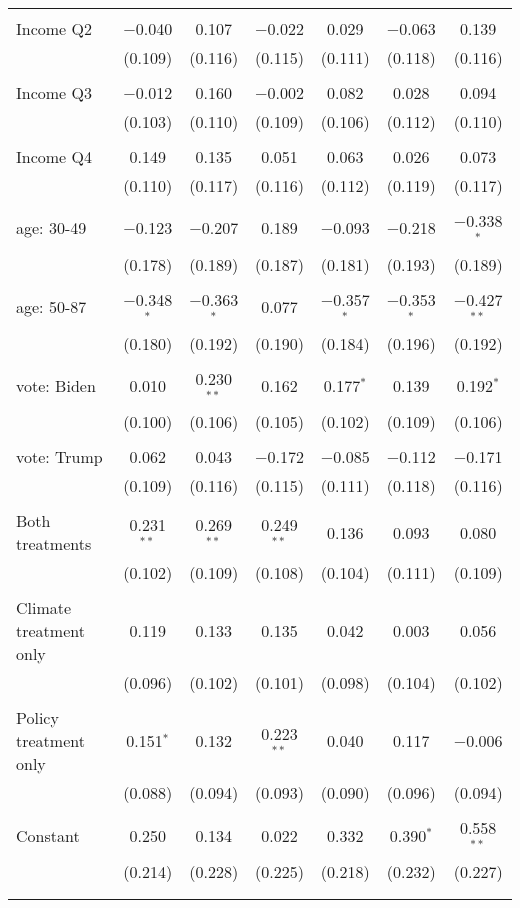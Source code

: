 \begin{tabular}{@{\extracolsep{5pt}}lcccccc}
  & & & & & & \\ 
 Income Q2 & $-$0.040 & 0.107 & $-$0.022 & 0.029 & $-$0.063 & 0.139 \\ 
  & (0.109) & (0.116) & (0.115) & (0.111) & (0.118) & (0.116) \\ 
  & & & & & & \\ 
 Income Q3 & $-$0.012 & 0.160 & $-$0.002 & 0.082 & 0.028 & 0.094 \\ 
  & (0.103) & (0.110) & (0.109) & (0.106) & (0.112) & (0.110) \\ 
  & & & & & & \\ 
 Income Q4 & 0.149 & 0.135 & 0.051 & 0.063 & 0.026 & 0.073 \\ 
  & (0.110) & (0.117) & (0.116) & (0.112) & (0.119) & (0.117) \\ 
  & & & & & & \\ 
 age: 30-49 & $-$0.123 & $-$0.207 & 0.189 & $-$0.093 & $-$0.218 & $-$0.338$^{*}$ \\ 
  & (0.178) & (0.189) & (0.187) & (0.181) & (0.193) & (0.189) \\ 
  & & & & & & \\ 
 age: 50-87 & $-$0.348$^{*}$ & $-$0.363$^{*}$ & 0.077 & $-$0.357$^{*}$ & $-$0.353$^{*}$ & $-$0.427$^{**}$ \\ 
  & (0.180) & (0.192) & (0.190) & (0.184) & (0.196) & (0.192) \\ 
  & & & & & & \\ 
 vote: Biden & 0.010 & 0.230$^{**}$ & 0.162 & 0.177$^{*}$ & 0.139 & 0.192$^{*}$ \\ 
  & (0.100) & (0.106) & (0.105) & (0.102) & (0.109) & (0.106) \\ 
  & & & & & & \\ 
 vote: Trump & 0.062 & 0.043 & $-$0.172 & $-$0.085 & $-$0.112 & $-$0.171 \\ 
  & (0.109) & (0.116) & (0.115) & (0.111) & (0.118) & (0.116) \\ 
  & & & & & & \\ 
 Both treatments & 0.231$^{**}$ & 0.269$^{**}$ & 0.249$^{**}$ & 0.136 & 0.093 & 0.080 \\ 
  & (0.102) & (0.109) & (0.108) & (0.104) & (0.111) & (0.109) \\ 
  & & & & & & \\ 
 Climate treatment only & 0.119 & 0.133 & 0.135 & 0.042 & 0.003 & 0.056 \\ 
  & (0.096) & (0.102) & (0.101) & (0.098) & (0.104) & (0.102) \\ 
  & & & & & & \\ 
 Policy treatment only & 0.151$^{*}$ & 0.132 & 0.223$^{**}$ & 0.040 & 0.117 & $-$0.006 \\ 
  & (0.088) & (0.094) & (0.093) & (0.090) & (0.096) & (0.094) \\ 
  & & & & & & \\ 
 Constant & 0.250 & 0.134 & 0.022 & 0.332 & 0.390$^{*}$ & 0.558$^{**}$ \\ 
  & (0.214) & (0.228) & (0.225) & (0.218) & (0.232) & (0.227) \\ 
  & & & & & & \\ 
\hline \\[-1.8ex] 


\end{tabular}
